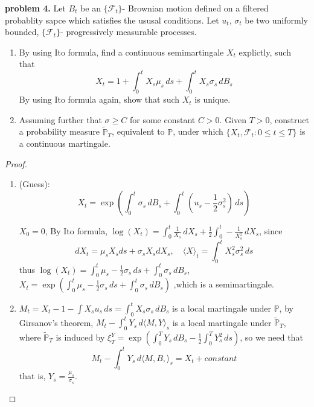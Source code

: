 \documentclass{article}     %
\begin{document}
    
    
\noindent
\textbf{problem 4.} Let $B_t$ be an $\{\mathcal{F}_t\}$- Brownian motion defined on a filtered probablity sapce which satisfies the ususal conditions. Let $u_t$, $\sigma_t$ be two uniformly bounded, $\{\mathcal{F}_t\}$- progressively measurable processes.
\begin{enumerate}[(1)]
    \item By using Ito formula, find a continuous semimartingale $X_t$ explictly, such that 
     \[ X_t = 1+ \int_0^t X_s\mu_s\,ds+ \int_0^t X_s\sigma_s\,dB_s \]
     By using Ito formula again, show that such $X_t$ is unique.
    \item Assuming further that $\sigma \geq C$ for some constant $C>0$. Given $T>0$, construct a probability measure $\widetilde{\mathbb{P}}_T$, equivalent to $\mathbb{P}$, under which $\{X_t,\mathcal{F}_t:0\leq t \leq T \}$ is a continuous martingale.
\end{enumerate}
\begin{proof}
\begin{enumerate}[(1)]
    \item (Guess):\[X_t = \exp\left( \int_0^t\sigma_s \,dB_s + \int_0^t (u_s-\frac{1}{2}\sigma^2_s)\,ds \right )\]
    
    $X_0=0$, By Ito formula, $\log(X_t)=\int_0^t\frac{1}{X_s}\,dX_s+\frac{1}{2}\int_0^t -\frac{1}{X^2_s}\,dX_s$, since 
     \[dX_t = \mu_sX_sds + \sigma_s X_sdX_s,\quad \langle X \rangle_t  = \int_0^t X_s^2\sigma_s^2\,ds\]
     thus $\log(X_t)= \int_0^t \mu_s-\frac{1}{2}\sigma_s\,ds+\int_0^t \sigma_s \,dB_s$, $X_t=\exp\left(\int_0^t \mu_s-\frac{1}{2}\sigma_s\,ds+\int_0^t \sigma_s \,dB_s\right)$
     ,which is a semimartingale. 
     
     
     
     
     
     
    \item $M_t=X_t - 1 -\int X_su_s\,ds = \int_0^t X_s\sigma_s\,dB_s$ is a local martingale under $\mathbb{P}$, by Girsanov's theorem, $M_t- \int_0^t Y_s\,d\langle M,Y\rangle_s$ is a local martingale under $\widetilde{\mathbb{P}}_T$, where $\widetilde{\mathbb{P}}_T$ is induced by $\xi_T^Y=\exp\left( \int_0^T Y_s\,dB_s-\frac{1}{2}\int_0^T Y^2_s\,ds\right)$, so we need that 
     \[M_t-\int_0^t Y_s\,d\langle M,B,\rangle_s=X_t +constant\]
     that is, $Y_s= \frac{\mu_s}{\sigma_s}$.
\end{enumerate}
\end{proof}
\end{document}
